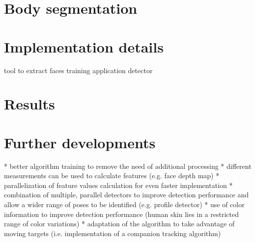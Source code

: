 \documentclass[a4paper,11pt,titlepage]{article}
\begin{document}
\section{Body segmentation}

\section{Implementation details}
tool to extract faces
training application
detector


\section{Results}

\section{Further developments}
* better algorithm training to remove the need of additional processing
* different measurements can be used to calculate features (e.g. face depth map)
* parallelization of feature values calculation for even faster implementation
* combination of multiple, parallel detectors to improve detection performance
  and allow a wider range of poses to be identified (e.g. profile detector)
* use of color information to improve detection performance (human skin lies in
  a restricted range of color variations)
* adaptation of the algorithm to take advantage of moving targets (i.e.
  implementation of a companion tracking algorithm)
\end{document}

